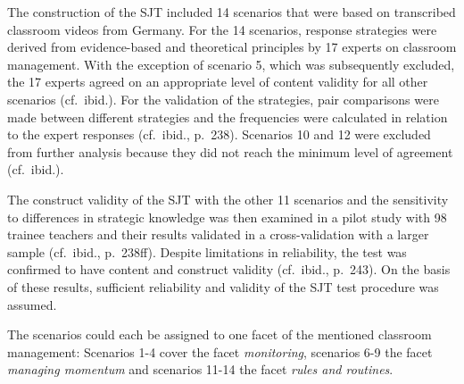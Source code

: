\documentclass[
  man]{apa6}
\begin{document}
The construction of the SJT included 14 scenarios that were based on transcribed classroom videos from Germany. For the 14 scenarios, response strategies were derived from evidence-based and theoretical principles by 17 experts on classroom management. With the exception of scenario 5, which was subsequently excluded, the 17 experts agreed on an appropriate level of content validity for all other scenarios (cf.~ibid.). For the validation of the strategies, pair comparisons were made between different strategies and the frequencies were calculated in relation to the expert responses (cf.~ibid., p.~238). Scenarios 10 and 12 were excluded from further analysis because they did not reach the minimum level of agreement (cf.~ibid.).

The construct validity of the SJT with the other 11 scenarios and the sensitivity to differences in strategic knowledge was then examined in a pilot study with 98 trainee teachers and their results validated in a cross-validation with a larger sample (cf.~ibid., p.~238ff). Despite limitations in reliability, the test was confirmed to have content and construct validity (cf.~ibid., p.~243). On the basis of these results, sufficient reliability and validity of the SJT test procedure was assumed.

The scenarios could each be assigned to one facet of the mentioned classroom management: Scenarios 1-4 cover the facet \emph{monitoring}, scenarios 6-9 the facet \emph{managing momentum} and scenarios 11-14 the facet \emph{rules and routines}.
\end{document}
